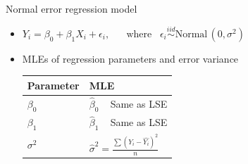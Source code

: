 \documentclass{article}
\begin{document}
Normal error regression model\bigskip
\begin{itemize}
    \item $Y_i = \beta_0 + \beta_1 X_i + \epsilon_i, \hspace{20pt} \text{where} \hspace{10pt} \epsilon_i \overset{iid}\sim \text{Normal}\,(0,\sigma^2)$
    \item MLEs of regression parameters and error variance\bigskip\\
    \begin{tabular}{l l}
        Parameter  & MLE\\
        \hline
        $\beta_0$ & $\hat{\beta}_0 \hspace{10pt}$ Same as LSE\\
        $\beta_1$  & $\hat{\beta}_1 \hspace{10pt}$ Same as LSE\\
        $\sigma^2$ & $\displaystyle \hat{\sigma}^2 = \frac{\sum (Y_i - \hat{Y_i})^2}{n}$\\
    \end{tabular}
\end{itemize}\bigskip
\end{document}
